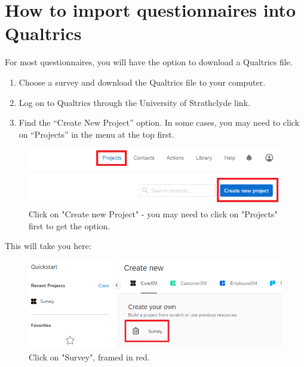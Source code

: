 \documentclass[
]{book}
\providecommand{\tightlist}{%
  \setlength{\itemsep}{0pt}\setlength{\parskip}{0pt}}
\begin{document}
\hypertarget{how-to-import-questionnaires-into-qualtrics}{%
\section{How to import questionnaires into Qualtrics}\label{how-to-import-questionnaires-into-qualtrics}}

For most questionnaires, you will have the option to download a Qualtrics file.

\begin{enumerate}
\def\labelenumi{\arabic{enumi}.}
\tightlist
\item
  Choose a survey and download the Qualtrics file to your computer.
\item
  Log on to Qualtrics through the University of Strathclyde link.
\item
  Find the ``Create New Project'' option. In some cases, you may need to click on ``Projects'' in the menu at the top first.
\end{enumerate}

\begin{figure}

{\centering \includegraphics[width=0.85\linewidth]{images/Qualtrics/02NewProject} 

}

\caption{Click on "Create new Project" - you may need to click on "Projects" first to get the option.}\label{fig:Figure11-2}
\end{figure}

This will take you here:

\begin{figure}

{\centering \includegraphics[width=0.85\linewidth]{images/Qualtrics/03NewProject2} 

}

\caption{Click on "Survey", framed in red.}\label{fig:Figure11-3}
\end{figure}
\end{document}
